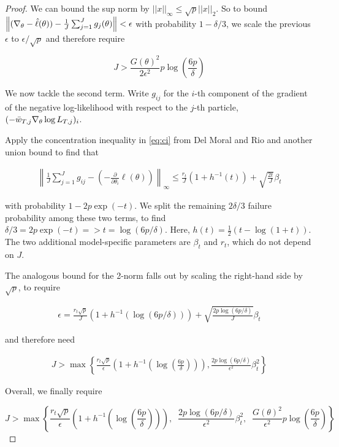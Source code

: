 \documentclass{article}
\begin{document}
\begin{proof}
We can bound the sup norm by $||x||_\infty \leq \sqrt{p}||x||_2$. So to bound $\left\lVert (\nabla_\theta - \hat{\ell}(\theta)) - \frac{1}{J}\sum_{j=1}^J g_j(\theta)\right\rVert < \epsilon$ with probability $1-\delta/3$, we scale the previous $\epsilon$ to $\epsilon/\sqrt{p}$ and therefore require

\begin{equation}
    J > \frac{G(\theta)^2}{2\epsilon^2}p\log\left(\frac{6p}{\delta}\right)
\end{equation}
    

We now tackle the second term. Write $g_{ij}$ for the $i$-th component of the gradient of the negative log-likelihood with respect to the $j$-th particle, $(-\bar{w}_{T,j} \nabla_\theta\log L_{T,j})_i$.

Apply the concentration inequality in \ref{eq:ci} from Del Moral and Rio \cite{delmoral2011ci} and another union bound to find that  

\begin{align}
    \left\lVert\frac{1}{J}\sum_{j=1}^J g_{ij} - \left(-\frac{\partial}{\partial \theta_i}\ell(\theta)\right)\right\rVert_\infty \leq \frac{r_t}{J}(1+h^{-1}(t)) + \sqrt{\frac{2t}{J}}\beta_t 
\end{align}

with probability $1-2p\exp(-t)$. We split the remaining $2\delta/3$ failure probability among these two terms, to find $\delta/3=2p\exp(-t) => t=\log(6p/\delta)$. Here, $h(t) = \frac{1}{2}(t - \log(1+t))$. The two additional model-specific parameters are $\beta_t$ and $r_t$, which do not depend on $J$. 

The analogous bound for the 2-norm falls out by scaling the right-hand side by $\sqrt{p}$, to require 

\begin{align}
    \epsilon = \frac{r_t\sqrt{p}}{J}(1+h^{-1}(\log(6p/\delta))) + \sqrt{\frac{2p\log(6p/\delta)}{J}}\beta_t
\end{align}

and therefore need 

\begin{align}
    J > \max\left\{\frac{r_t\sqrt{p}}{\epsilon}\left(1+h^{-1}\left(\log\left(\frac{6p}{\delta}\right)\right)\right), \frac{2p\log(6p/\delta)}{\epsilon^2}\beta_t^2\right\}
\end{align}

Overall, we finally require

\begin{equation}
        J > \max\left\{\frac{r_t\sqrt{p}}{\epsilon}\left(1+h^{-1}\left(\log\left(\frac{6p}{\delta}\right)\right)\right),\;\; \frac{2p\log(6p/\delta)}{\epsilon^2}\beta_t^2, \;\;\frac{G(\theta)^2}{\epsilon^2}p\log\left(\frac{6p}{\delta}\right)\right\}
\end{equation}

\end{proof}
\end{document}
